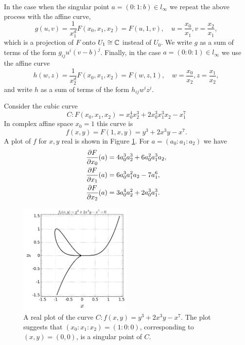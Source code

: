 In the case when the singular point $a = (0 : 1 : b) \in l_\infty$ we repeat the
above process with the affine curve,
\[
  g(u,v) = \frac{1}{x_1^d} F(x_0, x_1, x_2) = F(u,1,v), \quad u =
  \frac{x_0}{x_1}, v = \frac{x_2}{x_1},
\]
which is a projection of $F$ onto $U_1 \cong \operatorname{\mathbb{C}}$ instead of $U_0$. We write $g$
as a sum of terms of the form $g_{ij}u^i(v-b)^j$. Finally, in the case $a = (0 :
0 : 1) \in l_\infty$ we use the affine curve
\[
  h(w,z) = \frac{1}{x_2^d} F(x_0, x_1, x_2) = F(w,z,1), \quad w =
  \frac{x_0}{x_2}, z = \frac{x_1}{x_2},
\]
and write $h$ as a sum of terms of the form $h_{ij}w^iz^j$.

\begin{example} \label{ex: 2-cubic}
Consider the cubic curve
\[
  C: F(x_0,x_1,x_2) = x_0^4 x_2^3 + 2 x_0^3 x_1^3 x_2 - x_1^7
\]
In complex affine space $x_0 = 1$ this curve is
\[
  f(x,y) = F(1,x,y) = y^3 + 2 x^3 y - x^7.
\]
A plot of $f$ for $x,y$ real is shown in Figure \ref{fig: example-cubic}. For $a
= (a_0 : a_1 : a_2)$ we have
\begin{align} \label{eq: singular-conditions}
  \frac{\partial F}{\partial x_0}(a)
  &=
  4 a_{0}^{3} a_{2}^{3} + 6 a_{0}^{2} a_{1}^{3} a_{2}, \notag \\
  \frac{\partial F}{\partial x_1}(a)
  &=
  6 a_{0}^{3} a_{1}^{2} a_{2} - 7 a_{1}^{6}, \notag \\
  \frac{\partial F}{\partial x_2}(a)
  &=
  3 a_{0}^{4} a_{2}^{2} + 2 a_{0}^{3} a_{1}^{3}.
\end{align}

\begin{figure}
  \centering
  \includegraphics[width=0.5\textwidth]{images/f2.png}
  \caption{A real plot of the curve $C : f(x,y) = y^3 + 2 x^3 y - x^7$. The plot
    suggests that $(x_0 : x_1 : x_2) = (1 : 0 : 0)$, corresponding to $(x,y) =
    (0,0)$, is a singular point of $C$.}
  \label{fig: example-cubic}
\end{figure}


\end{example}

